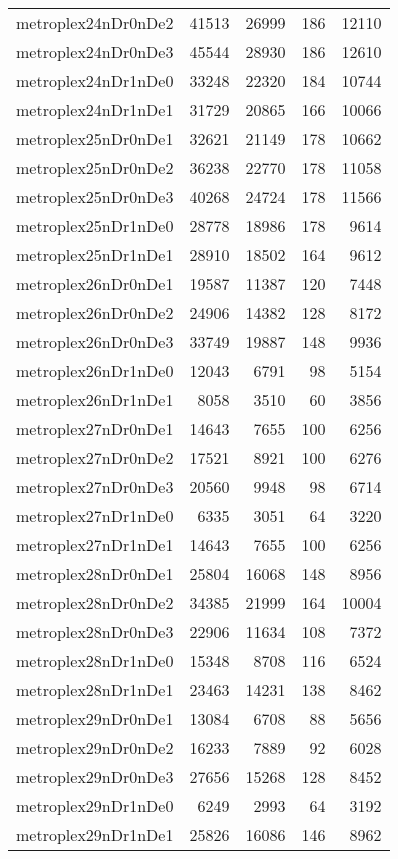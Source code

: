 \begin{longtable}{lrrrr}
metroplex24nDr0nDe2 & 41513 & 26999 & 186 & 12110 \\
metroplex24nDr0nDe3 & 45544 & 28930 & 186 & 12610 \\
metroplex24nDr1nDe0 & 33248 & 22320 & 184 & 10744 \\
metroplex24nDr1nDe1 & 31729 & 20865 & 166 & 10066 \\
metroplex25nDr0nDe1 & 32621 & 21149 & 178 & 10662 \\
metroplex25nDr0nDe2 & 36238 & 22770 & 178 & 11058 \\
metroplex25nDr0nDe3 & 40268 & 24724 & 178 & 11566 \\
metroplex25nDr1nDe0 & 28778 & 18986 & 178 & 9614 \\
metroplex25nDr1nDe1 & 28910 & 18502 & 164 & 9612 \\
metroplex26nDr0nDe1 & 19587 & 11387 & 120 & 7448 \\
metroplex26nDr0nDe2 & 24906 & 14382 & 128 & 8172 \\
metroplex26nDr0nDe3 & 33749 & 19887 & 148 & 9936 \\
metroplex26nDr1nDe0 & 12043 & 6791 & 98 & 5154 \\
metroplex26nDr1nDe1 & 8058 & 3510 & 60 & 3856 \\
metroplex27nDr0nDe1 & 14643 & 7655 & 100 & 6256 \\
metroplex27nDr0nDe2 & 17521 & 8921 & 100 & 6276 \\
metroplex27nDr0nDe3 & 20560 & 9948 & 98 & 6714 \\
metroplex27nDr1nDe0 & 6335 & 3051 & 64 & 3220 \\
metroplex27nDr1nDe1 & 14643 & 7655 & 100 & 6256 \\
metroplex28nDr0nDe1 & 25804 & 16068 & 148 & 8956 \\
metroplex28nDr0nDe2 & 34385 & 21999 & 164 & 10004 \\
metroplex28nDr0nDe3 & 22906 & 11634 & 108 & 7372 \\
metroplex28nDr1nDe0 & 15348 & 8708 & 116 & 6524 \\
metroplex28nDr1nDe1 & 23463 & 14231 & 138 & 8462 \\
metroplex29nDr0nDe1 & 13084 & 6708 & 88 & 5656 \\
metroplex29nDr0nDe2 & 16233 & 7889 & 92 & 6028 \\
metroplex29nDr0nDe3 & 27656 & 15268 & 128 & 8452 \\
metroplex29nDr1nDe0 & 6249 & 2993 & 64 & 3192 \\
metroplex29nDr1nDe1 & 25826 & 16086 & 146 & 8962 \\

\end{longtable}
